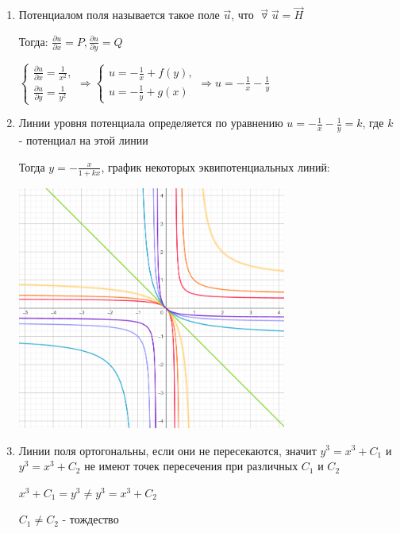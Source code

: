 \begin{enumerate}
    \item Потенциалом поля называется такое поле $\overrightarrow{u}$, что $\overrightarrow{\triangledown}\overrightarrow{u} = \overrightarrow{H}$

    Тогда: $\frac{\partial u}{\partial x} = P, \frac{\partial u}{\partial y} = Q$

    $\displaystyle \begin{cases}\frac{\partial u}{\partial x} = \frac{1}{x^2}, \\ \frac{\partial u}{\partial y} = \frac{1}{y^2}\end{cases} \Longrightarrow
    \begin{cases}u = -\frac{1}{x} + f(y), \\ u = -\frac{1}{y} + g(x)\end{cases} \Longrightarrow u = -\frac{1}{x} - \frac{1}{y}$

    \item Линии уровня потенциала определяется по уравнению $u = -\frac{1}{x} - \frac{1}{y} = k$, где $k$ - потенциал на этой линии

    Тогда $\displaystyle y = -\frac{x}{1 + kx}$, график некоторых эквипотенциальных линий:

    \begin{center}
        \includegraphics[height=80mm]{images/4d1}
    \end{center}


    \item Линии поля ортогональны, если они не пересекаются, значит $y^3 = x^3 + C_1$ и $y^3 = x^3 + C_2$ не имеют точек пересечения при различных $C_1$ и $C_2$

    $x^3 + C_1 = y^3 \neq y^3 = x^3 + C_2$

    $C_1 \neq C_2$ - тождество


\end{enumerate}
